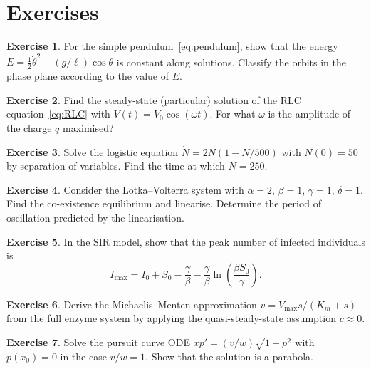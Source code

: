 \documentclass[12pt,a4paper,openany]{book}
\theoremstyle{definition}
\newtheorem{exercise}{Exercise}[chapter]
\theoremstyle{plain}
\theoremstyle{remark}
\begin{document}
\section{Exercises}
\label{sec:ch10-exercises}

\begin{exercise}
\label{exer:pendulum-energy}
For the simple pendulum~\eqref{eq:pendulum}, show that the energy
$E=\frac{1}{2}\dot{\theta}^{2}-(g/\ell)\cos\theta$ is constant along
solutions. Classify the orbits in the phase plane according to the
value of $E$.
\end{exercise}

\begin{exercise}
\label{exer:rlc-forced}
Find the steady-state (particular) solution of the RLC
equation~\eqref{eq:RLC} with $V(t)=V_{0}\cos(\omega t)$. For what
$\omega$ is the amplitude of the charge $q$ maximised?
\end{exercise}

\begin{exercise}
\label{exer:logistic-solve}
Solve the logistic equation $\dot{N}=2N(1-N/500)$ with $N(0)=50$ by
separation of variables. Find the time at which $N=250$.
\end{exercise}

\begin{exercise}
\label{exer:lv-linearise}
Consider the Lotka--Volterra system with $\alpha=2$, $\beta=1$,
$\gamma=1$, $\delta=1$. Find the co-existence equilibrium and
linearise. Determine the period of oscillation predicted by the
linearisation.
\end{exercise}

\begin{exercise}
\label{exer:sir-peak}
In the SIR model, show that the peak number of infected individuals is
\[
  I_{\max} = I_{0}+S_{0}-\frac{\gamma}{\beta}
    -\frac{\gamma}{\beta}\ln\!\left(\frac{\beta S_{0}}{\gamma}\right).
\]
\end{exercise}

\begin{exercise}
\label{exer:michaelis-menten-solve}
Derive the Michaelis--Menten approximation
$v=V_{\max}s/(K_{m}+s)$ from the full enzyme system by applying the
quasi-steady-state assumption $\dot{c}\approx 0$.
\end{exercise}

\begin{exercise}
\label{exer:pursuit-solve}
Solve the pursuit curve ODE $xp'=(v/w)\sqrt{1+p^{2}}$ with
$p(x_{0})=0$ in the case $v/w=1$. Show that the solution is a
parabola.
\end{exercise}
\end{document}
